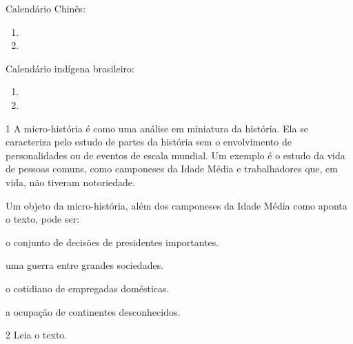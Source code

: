 Calendário Chinês:

\begin{enumerate}
\item {}

\item {}
\end{enumerate}

Calendário indígena brasileiro:

\begin{enumerate}
\item {}

\item {}
\end{enumerate}


\num{1} A micro-história é como uma análise em miniatura da história. Ela se caracteriza pelo estudo de partes da história sem o envolvimento de personalidades ou de eventos de escala mundial. Um
exemplo é o estudo da vida de pessoas comuns, como camponeses da Idade Média e trabalhadores que, em vida, não tiveram notoriedade.

Um objeto da micro-história, além dos camponeses da Idade Média como
aponta o texto, pode ser:

\begin{escolha}
\item o conjunto de decisões de presidentes importantes.

\item uma guerra entre grandes sociedades.

\item o cotidiano de empregadas domésticas.

\item a ocupação de continentes desconhecidos.
\end{escolha}


\num{2} Leia o texto.

